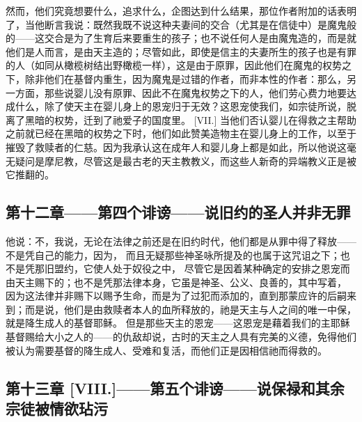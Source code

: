 然而，他们究竟想要什么，追求什么，企图达到什么结果，那位作者附加的话表明了，当他断言我说：既然我既不说这种夫妻间的交合（尤其是在信徒中）是魔鬼般的——这交合是为了生育后来要重生的孩子；也不说任何人是由魔鬼造的，而是就他们是人而言，是由天主造的；尽管如此，即使是信主的夫妻所生的孩子也是有罪的人（如同从橄榄树结出野橄榄一样），这是由于原罪，因此他们在魔鬼的权势之下，除非他们在基督内重生，因为魔鬼是过错的作者，而非本性的作者：那么，另一方面，那些说婴儿没有原罪、因此不在魔鬼权势之下的人，他们劳心费力地要达成什么，除了使天主在婴儿身上的恩宠归于无效？这恩宠使我们，如宗徒所说，脱离了黑暗的权势，迁到了祂爱子的国度里。 [VII.] 当他们否认婴儿在得救之主帮助之前就已经在黑暗的权势之下时，他们如此赞美造物主在婴儿身上的工作，以至于摧毁了救赎者的仁慈。因为我承认这在成年人和婴儿身上都是如此，所以他说这毫无疑问是摩尼教，尽管这是最古老的天主教教义，而这些人新奇的异端教义正是被它推翻的。\par


\subsection{第十二章——第四个诽谤——说旧约的圣人并非无罪}

他说：不，我说，无论在法律之前还是在旧约时代，他们都是从罪中得了释放——不是凭自己的能力，因为， 而且无疑那些神圣咏所提及的也属于这咒诅之下；也不是凭那旧盟约，它使人处于奴役之中， 尽管它是因着某种确定的安排之恩宠而由天主赐下的；也不是凭那法律本身，它虽是神圣、公义、良善的，其中写着， 因为这法律并非赐下以赐予生命，而是为了过犯而添加的，直到那蒙应许的后嗣来到；而是说，他们是由救赎者本人的血所释放的，祂是天主与人之间的唯一中保，就是降生成人的基督耶稣。 但是那些天主的恩宠——这恩宠是藉着我们的主耶稣基督赐给大小之人的——的仇敌却说，古时的天主之人具有完美的义德，免得他们被认为需要基督的降生成人、受难和复活，而他们正是因相信祂而得救的。\par


\subsection{第十三章 [VIII.]——第五个诽谤——说保禄和其余宗徒被情欲玷污}

